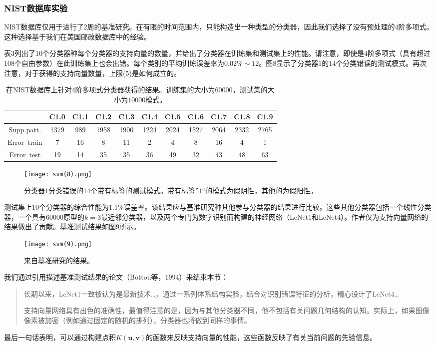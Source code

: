 \documentclass[lang=cn,11pt,a4paper]{elegantpaper}
\begin{document}
	\subsubsection{NIST数据库实验}
	NIST数据库仅用于进行了$2$周的基准研究。在有限的时间范围内，只能构造出一种类型的分类器，因此我们选择了没有预处理的$4$阶多项式。这种选择基于我们在美国邮政数据库中的经验。

	表3列出了$10$个分类器种每个分类器的支持向量的数量，并给出了分类器在训练集和测试集上的性能。请注意，即使是$4$阶多项式（具有超过$108$个自由参数）在此训练集上也会出错。每个类别的平均训练误差率为$0.02\%\sim12$。图8显示了分类器$1$的$14$个分类错误的测试模式。再次注意，对于获得的支持向量数量，上限(5)是如何成立的。

	\begin{table}[!htbp]
		\centering
		\caption{在NIST数据库上针对$4$阶多项式分类器获得的结果。训练集的大小为$60000$，测试集的大小为$10000$模式。}
		\begin{tabular}{ccccccccccc}
			\hline
			{} & {C1.0} & {C1.1} & {C1.2} & {C1.3} & {C1.4} & {C1.5} & {C1.6} & {C1.7} & {C1.8} &{C1.9} \\
			\hline
			{Supp.patt.} & 1379 & 989 & 1958 & 1900 & 1224 & 2024 & 1527 & 2064 & 2332 & 2765 \\
			{Error\ train} & 7 & 16 & 8 & 11 & 2 & 4 & 8 & 16 & 4 & 1 \\
			{Error\ test} & 19 & 14 & 35 & 35 & 36 & 49 & 32 & 43 & 48 & 63 \\
    		\hline
		\end{tabular}
	\end{table}
	\begin{figure}[htbp]
		\centering
		\texttt{[image: svm(8).png]}
		\caption{分类器$1$分类错误的$14$个带有标签的测试模式。带有标签”$1$“的模式为假阴性，其他的为假阳性。}
	\end{figure}
	测试集上$10$个分类器的综合性能为$1.1\%$误差率。该结果应与基准研究种其他参与分类器的结果进行比较。这些其他分类器包括一个线性分类器，一个具有$60000$原型的$k=3$最近邻分类器，以及两个专门为数字识别而构建的神经网络（LeNet1和LeNet4）。作者仅为支持向量网络的结果做出了贡献。基准测试结果如图9所示。
	\begin{figure}[htbp]
		\centering
		\texttt{[image: svm(9).png]}
		\caption{来自基准研究的结果。}
	\end{figure}
	我们通过引用描述基准测试结果的论文（Bottou等，1994）来结束本节：
	\begin{quote}
		长期以来，LeNet1一致被认为是最新技术…，通过一系列体系结构实验，结合对识别错误特征的分析，精心设计了LeNet4…

		支持向量网络具有出色的准确性，最值得注意的是，因为与其他分类器不同，他不包括有关问题几何结构的认知。实际上，如果图像像素被加密（例如通过固定的随机的排列），分类器也将做到同样的事情。
	\end{quote}
	最后一句话表明，可以通过构建点积$K(\mathbf{u},\mathbf{v})$的函数来反映支持向量的性能，这些函数反映了有关当前问题的先验信息。
\end{document}
